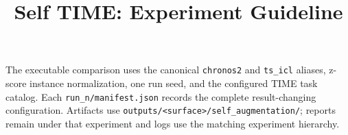 \documentclass{article}
\title{Self TIME: Experiment Guideline}
\author{}
\date{}
\begin{document}
\maketitle
The executable comparison uses the canonical \texttt{chronos2} and
\texttt{ts\_icl} aliases, z-score instance normalization, one run seed, and the
configured TIME task catalog. Each \texttt{run\_n/manifest.json} records the
complete result-changing configuration. Artifacts use
\texttt{outputs/<surface>/self\_augmentation/}; reports remain under that
experiment and logs use the matching experiment hierarchy.
\end{document}
